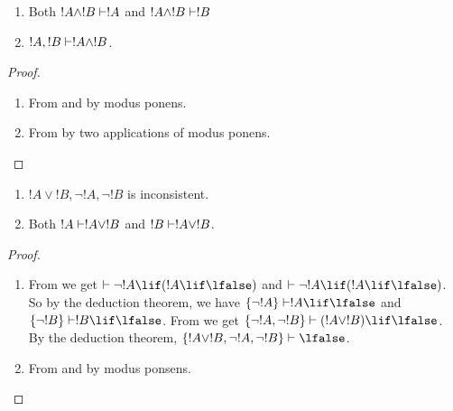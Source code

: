 \documentclass[../../../include/open-logic-section]{subfiles}
\begin{document}


\begin{prop}
  \begin{enumerate}
  \item {} Both $!A \land !B \Proves
    !A$ and $!A \land !B \Proves !B$
  \item {} $!A, !B \Proves !A \land !B$.
  \end{enumerate}
\end{prop}

\begin{proof}
  \begin{enumerate}
    \item From  and  by
      modus ponens.
  \item From  by two applications of
    modus ponens.
  \end{enumerate}
\end{proof}


\begin{prop}
  \begin{enumerate}
  \item $!A \lor !B, \lnot !A, \lnot !B$ is inconsistent.
  \item Both $!A \Proves !A \lor !B$ and $!B \Proves !A \lor !B$.
  \end{enumerate}
\end{prop}

\begin{proof}
  \begin{enumerate}
  \item From  we get $\Proves \lnot !A \lif (!A
    \lif \lfalse)$ and $\Proves \lnot !A \lif (!A \lif \lfalse)$. So
    by the deduction theorem, we have $\{\lnot !A\} \Proves !A \lif
    \lfalse$ and $\{\lnot !B\} \Proves !B \lif \lfalse$. From
     we get $\{\lnot !A, \lnot !B\} \Proves (!A
    \lor !B) \lif \lfalse$. By the deduction theorem, $\{!A \lor !B,
    \lnot !A, \lnot !B\} \Proves \lfalse$.
  \item From  and  by modus
    ponsens.
  \end{enumerate}
\end{proof}
\end{document}
